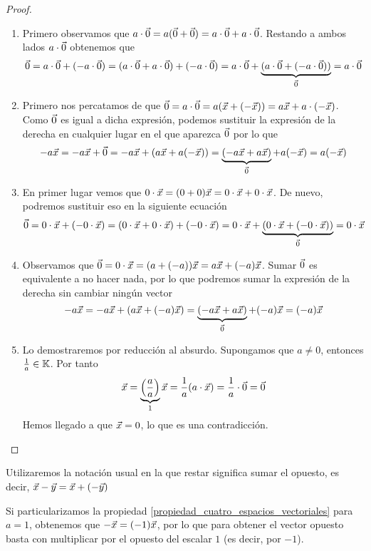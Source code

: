 \documentclass[../algebra_lineal.tex]{subfiles}
\begin{document}
\begin{proof}
    \begin{enumerate}[wide, labelwidth=0pt, labelindent=0pt]
        \item Primero observamos que $a\cdot \vec{0} = a(\vec{0} + \vec{0}) = a \cdot \vec{0} + a \cdot \vec{0} $. Restando a ambos lados $a\cdot \vec{0}$ obtenemos que 
            \[\vec{0} = a\cdot \vec{0} + (-a\cdot \vec{0}) = (a \cdot \vec{0} + a \cdot \vec{0}) + (-a \cdot \vec{0}) =  a \cdot \vec{0} + \underbrace{(a \cdot \vec{0} + (-a \cdot \vec{0}))}_{\vec{0}} = a \cdot \vec{0} \]
        \item Primero nos percatamos de que $\vec{0} = a \cdot \vec{0} = a(\vec{x} + (-\vec{x})) = a\vec{x} +a\cdot(-\vec{x})$. Como $\vec{0}$ es igual a dicha expresión, podemos sustituir la expresión de la derecha en cualquier lugar en el que aparezca $\vec{0}$ por lo que
         \[ -a\vec{x} = -a\vec{x} + \vec{0} = -a\vec{x} + (a\vec{x} + a(-\vec{x})) = \underbrace{(-a\vec{x} + a\vec{x})}_{\vec{0}} + a(-\vec{x}) = a(-\vec{x}) \] 
        \item En primer lugar vemos que $0 \cdot \vec{x} = (0+0)\vec{x} = 0 \cdot \vec{x} + 0 \cdot \vec{x}$. De nuevo, podremos sustituir eso en la siguiente ecuación
        \[\vec{0}  = 0 \cdot \vec{x} +(-0\cdot \vec{x}) = (0\cdot \vec{x} + 0\cdot \vec{x}) + (-0\cdot \vec{x}) =  0\cdot \vec{x} + \underbrace{(0\cdot \vec{x} + (-0\cdot \vec{x}))}_{\vec{0}} = 0\cdot\vec{x}\]
        \item Observamos que $\vec{0} = 0 \cdot \vec{x} = (a + (-a))\vec{x} = a\vec{x} + (-a)\vec{x}$. Sumar $\vec{0}$ es equivalente a no hacer nada, por lo que podremos sumar la expresión de la derecha sin cambiar ningún vector
        \[-a\vec{x} = -a\vec{x} + (a\vec{x} + (-a)\vec{x}) = \underbrace{(-a\vec{x} + a\vec{x})}_{\vec{0}} + (-a)\vec{x} = (-a)\vec{x} \]
        \item Lo demostraremos por reducción al absurdo. Supongamos que $a \neq 0$, entonces $\frac{1}{a} \in \mathbb{K}$. Por tanto
        \[\vec{x} = \underbrace{\left(\frac{a}{a} \right)}_{1} \vec{x} = \frac{1}{a} (a \cdot \vec{x}) = \frac{1}{a} \cdot \vec{0} = \vec{0}\]
        Hemos llegado a que $\vec{x} = 0$, lo que es una contradicción.
    \end{enumerate}
\end{proof}

\begin{notation}
    Utilizaremos la notación usual en la que restar significa sumar el opuesto, es decir, $\vec{x} - \vec{y} = \vec{x} + (-\vec{y})$
\end{notation}

\begin{remark}
    Si particularizamos la propiedad \ref{propiedad_cuatro_espacios_vectoriales} para $a=1$, obtenemos que $-\vec{x} = (-1)\vec{x}$, por lo que para obtener el vector opuesto basta con multiplicar por el opuesto del escalar $1$ (es decir, por $-1$).
\end{remark}
\end{document}
